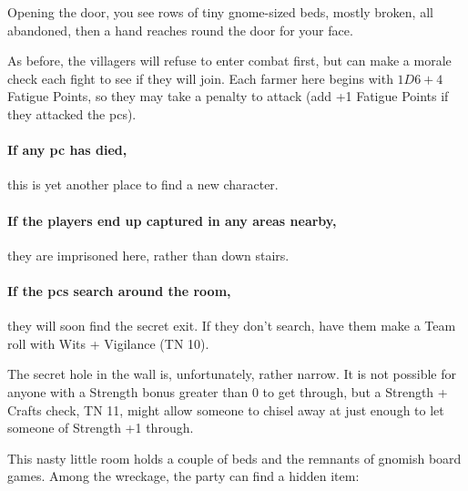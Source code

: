 \begin{multicols}{2}
\begin{boxtext}
  Opening the door, you see rows of tiny gnome-sized beds, mostly broken, all abandoned, then a hand reaches round the door for your face.
\end{boxtext}

As before, the villagers will refuse to enter combat first, but can make a morale check each fight to see if they will join.
Each farmer here begins with $1D6+4$ Fatigue Points, so they may take a penalty to attack (add +1 Fatigue Points if they attacked the \glspl{pc}).

\paragraph{If any \gls{pc} has died,}
this is yet another place to find a new character.

\paragraph{If the players end up captured in any areas nearby,}
they are imprisoned here, rather than down stairs.

\paragraph{If the \glspl{pc} search around the room,}
they will soon find the secret exit.
If they don't search, have them make a Team roll with Wits + Vigilance (TN 10).%

The secret hole in the wall is, unfortunately, rather narrow.
It is not possible for anyone with a Strength bonus greater than 0 to get through, but a Strength + Crafts check, TN 11, might allow someone to chisel away at just enough to let someone of Strength +1 through.


This nasty little room holds a couple of beds and the remnants of gnomish board games.
Among the wreckage, the party can find a hidden item:

\lootMagic

\end{multicols}

